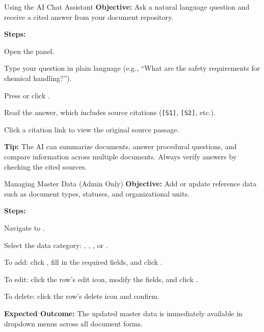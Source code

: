 \vspace{8pt}

\begin{ugTask}{Using the AI Chat Assistant}
  \textbf{Objective:} Ask a natural language question and
  receive a cited answer from your document repository.

  \textbf{Steps:}
  \begin{ugSteps}
    \item Open the  panel.
    \item Type your question in plain language
          (e.g., ``What are the safety requirements for
          chemical handling?'').
    \item Press  or click .
    \item Read the answer, which includes source citations
          (\texttt{[S1]}, \texttt{[S2]}, etc.).
    \item Click a citation link to view the original source
          passage.
  \end{ugSteps}

  \textbf{Tip:} The AI can summarize documents, answer
  procedural questions, and compare information across multiple
  documents. Always verify answers by checking the cited sources.
\end{ugTask}

\vspace{8pt}

\begin{ugTask}{Managing Master Data (Admin Only)}
  \textbf{Objective:} Add or update reference data such as
  document types, statuses, and organizational units.

  \textbf{Steps:}
  \begin{ugSteps}
    \item Navigate to .
    \item Select the data category: ,
          , , or
          .
    \item To add: click , fill in the
          required fields, and click .
    \item To edit: click the row's edit icon, modify the
          fields, and click .
    \item To delete: click the row's delete icon and confirm.
  \end{ugSteps}

  \textbf{Expected Outcome:} The updated master data is
  immediately available in dropdown menus across all document
  forms.
\end{ugTask}

